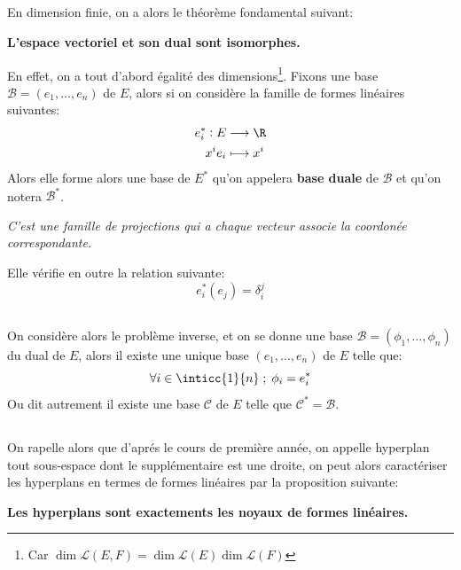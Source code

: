 \subsection*{}
En dimension finie, on a alors le théorème fondamental suivant:
\begin{center}
   \textbf{L'espace vectoriel et son dual sont isomorphes.}
\end{center}
En effet, on a tout d'abord égalité des dimensions\footnote[2]{Car \(\dim\mathcal{L}(E, F) = \dim\mathcal{L}(E)\dim\mathcal{L}(F)\)}. Fixons une base \(\mathscr{B} = (e_1, \ldots, e_n)\) de \(E\), alors si on considère la famille de formes linéaires suivantes:
\[
   \begin{aligned}
      e_i^* : E &\longrightarrow \R \\
      x^ie_i &\longmapsto x^i
   \end{aligned}
\]
Alors elle forme alors une base de \(E^*\) qu'on appelera \textbf{base duale} de \(\mathscr{B}\) et qu'on notera \(\mathscr{B}^*\).
\begin{center}
   \textit{C'est une famille de projections qui a chaque vecteur associe la coordonée correspondante.}
\end{center}
Elle vérifie en outre la relation suivante:
\[
   e_i^*(e_j) = \delta_{i}^j
\]

\subsection*{}
On considère alors le problème inverse, et on se donne une base \(\mathscr{B} = (\phi_1, \ldots, \phi_n)\) du dual de \(E\), alors il existe une unique base \((e_1, \ldots, e_n)\) de \(E\) telle que:
\[
   \forall i \in \inticc{1}{n} \; ; \; \phi_i = e_i^*   
\] 
Ou dit autrement il existe une base \(\mathscr{C}\) de \(E\) telle que \(\mathscr{C}^* = \mathscr{B}\).

\subsection*{}
On rapelle alors que d'aprés le cours de première année, on appelle hyperplan tout sous-espace dont le supplémentaire est une droite, on peut alors caractériser les hyperplans en termes de formes linéaires par la proposition suivante:
\begin{center}
   \textbf{Les hyperplans sont exactements les noyaux de formes linéaires.}
\end{center}



